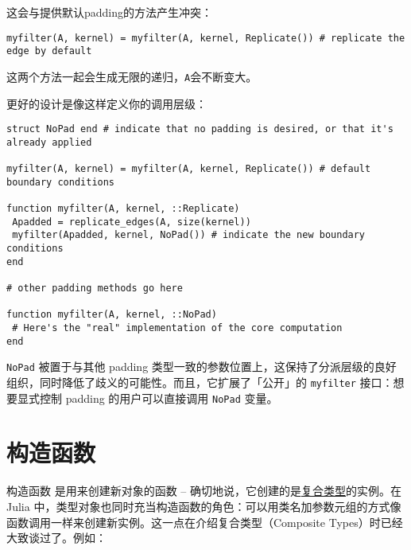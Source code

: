 这会与提供默认padding的方法产生冲突：




\begin{verbatim}
myfilter(A, kernel) = myfilter(A, kernel, Replicate()) # replicate the edge by default
\end{verbatim}



这两个方法一起会生成无限的递归，\texttt{A}会不断变大。



更好的设计是像这样定义你的调用层级：




\begin{verbatim}
struct NoPad end # indicate that no padding is desired, or that it's already applied

myfilter(A, kernel) = myfilter(A, kernel, Replicate()) # default boundary conditions

function myfilter(A, kernel, ::Replicate)
 Apadded = replicate_edges(A, size(kernel))
 myfilter(Apadded, kernel, NoPad()) # indicate the new boundary conditions
end

# other padding methods go here

function myfilter(A, kernel, ::NoPad)
 # Here's the "real" implementation of the core computation
end
\end{verbatim}



\texttt{NoPad} 被置于与其他 padding 类型一致的参数位置上，这保持了分派层级的良好组织，同时降低了歧义的可能性。而且，它扩展了「公开」的 \texttt{myfilter} 接口：想要显式控制 padding 的用户可以直接调用 \texttt{NoPad} 变量。





\hypertarget{17317810227993044854}{}


\chapter{构造函数}



构造函数 \footnotemark[1] 是用来创建新对象的函数 – 确切地说，它创建的是\hyperlink{4168730090950432836}{复合类型}的实例。在 Julia 中，类型对象也同时充当构造函数的角色：可以用类名加参数元组的方式像函数调用一样来创建新实例。这一点在介绍复合类型（Composite Types）时已经大致谈过了。例如：




